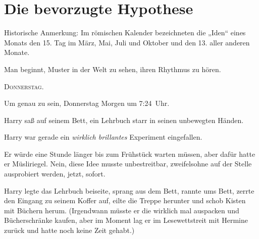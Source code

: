 \chapter{Die bevorzugte Hypothese}

\begin{chapterOpeningAuthorNote}
% 
Historische Anmerkung: Im römischen Kalender bezeichneten die „Iden“ eines Monats den 15. Tag im März, Mai, Juli und Oktober und den 13. aller anderen Monate.
\end{chapterOpeningAuthorNote}
\begin{chapterOpeningQuote}
Man beginnt, Muster in der Welt zu sehen, ihren Rhythmus zu hören.
\end{chapterOpeningQuote}

\lettrine{D}{onnerstag}.

\hplettrineextrapara
Um genau zu sein, Donnerstag Morgen um 7:24~Uhr.

Harry saß auf seinem Bett, ein Lehrbuch starr in seinen unbewegten Händen.

Harry war gerade ein \emph{wirklich brillantes} Experiment eingefallen.

Er würde eine Stunde länger bis zum Frühstück warten müssen, aber dafür hatte er Müsliriegel. Nein, diese Idee musste unbestreitbar, zweifelsohne auf der Stelle ausprobiert werden, jetzt, sofort.

Harry legte das Lehrbuch beiseite, sprang aus dem Bett, rannte ums Bett, zerrte den Eingang zu seinem Koffer auf, eilte die Treppe herunter und schob Kisten mit Büchern herum. (Irgendwann müsste er die wirklich mal auspacken und Bücherschränke kaufen, aber im Moment lag er im Lesewettstreit mit Hermine zurück und hatte noch keine Zeit gehabt.)

